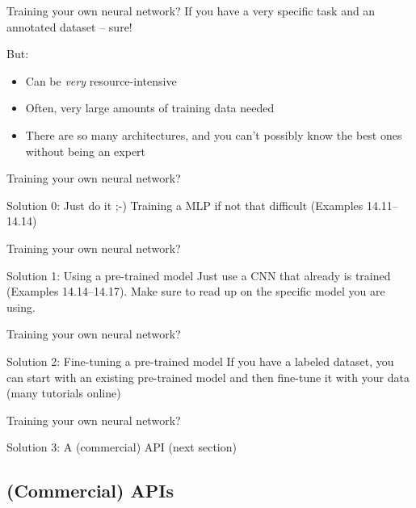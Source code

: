 \begin{frame}{Training your own neural network?}
  If you have a very specific task and an annotated dataset -- sure!

  But:
  \begin{itemize}
  \item Can be \emph{very} resource-intensive
  \item Often, very large amounts of training data needed
  \item There are so many architectures, and you can't possibly know the best ones without being an expert
  \end{itemize}
\end{frame}


\begin{frame}{Training your own neural network?}
  \begin{block}{Solution 0: Just do it ;-)}
Training a MLP if not that difficult (Examples 14.11--14.14)
  \end{block}
\end{frame}



\begin{frame}{Training your own neural network?}
  \begin{block}{Solution 1: Using a pre-trained model}
Just use a CNN that already is trained (Examples 14.14--14.17). Make sure to read up on the specific model you are using.
  \end{block}
\end{frame}

\begin{frame}{Training your own neural network?}
  \begin{block}{Solution 2: Fine-tuning a pre-trained model}
If you have a labeled dataset, you can start with an existing pre-trained model and then fine-tune it with your data (many tutorials online)
  \end{block}
\end{frame}


\begin{frame}{Training your own neural network?}
  \begin{block}{Solution 3: A (commercial) API}
    (next section)
  \end{block}
\end{frame}


  



\subsection{(Commercial) APIs}

